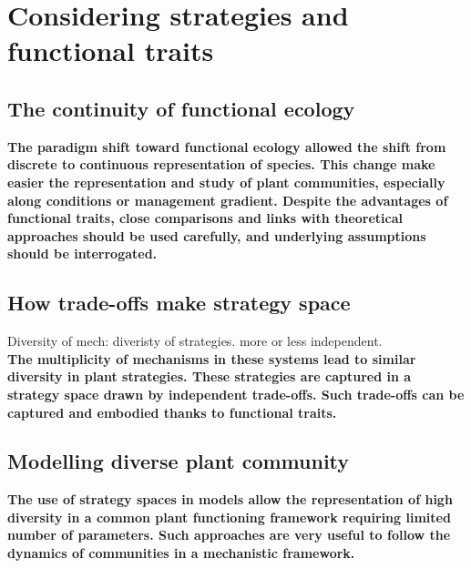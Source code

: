 \chapter{Considering strategies and functional traits}
\section{The continuity of functional ecology}

\textbf{The paradigm shift toward functional ecology allowed the shift from discrete to continuous representation of species. This change make easier the representation and study of plant communities, especially along conditions or management gradient. Despite the advantages of functional traits, close comparisons and links with theoretical approaches should be used carefully, and underlying assumptions should be interrogated.}

\section{How trade-offs make strategy space}

Diversity of mech: diveristy of strategies. more or less independent.\\

\textbf{The multiplicity of mechanisms in these systems lead to similar diversity in plant strategies. These strategies are captured in a strategy space drawn by independent trade-offs. Such trade-offs can be captured and embodied thanks to functional traits.}


\section{Modelling diverse plant community}

\textbf{The use of strategy spaces in models allow the representation of high diversity in a common plant functioning framework requiring limited number of parameters. Such approaches are very useful to follow the dynamics of communities in a mechanistic framework. }

